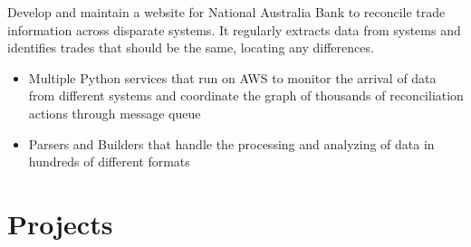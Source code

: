 \documentclass{resume}
\begin{document}
\begin{flushleft}
Develop and maintain a website for National Australia Bank to reconcile trade information across disparate systems. It regularly extracts data from systems and identifies trades that should be the same, locating any differences.
\begin{itemize}
  \item Multiple Python services that run on AWS to monitor the arrival of data from different systems and \linebreak coordinate the graph of thousands of reconciliation actions through message queue
  \item Parsers and Builders that handle the processing and analyzing of data in hundreds of different formats
\end{itemize}
\end{flushleft}

\section{Projects}
\end{document}
